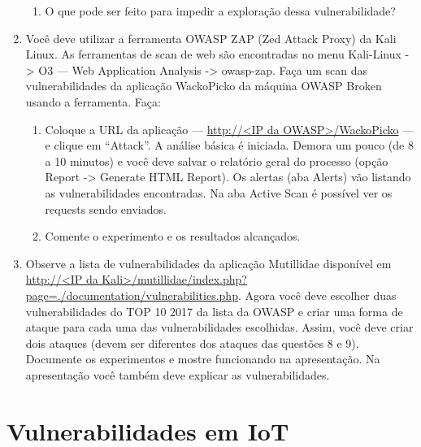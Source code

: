 \documentclass{article}
\begin{document}
\begin{enumerate}
\begin{enumerate}
                \item O que pode ser feito para impedir a exploração dessa
                    vulnerabilidade?
            \end{enumerate}
        \item Você deve utilizar a ferramenta OWASP ZAP (Zed Attack Proxy)
            da Kali Linux. As ferramentas de scan de web são encontradas no
            menu Kali-Linux -> O3 --- Web Application Analysis ->
            owasp-zap. Faça um scan das vulnerabilidades da aplicação
            WackoPicko da máquina OWASP Broken usando a ferramenta. Faça:
            \begin{enumerate}
                \item Coloque a URL da aplicação --- \url{http://<IP da
                    OWASP>/WackoPicko} --- e clique em ``Attack''. A
                    análise básica é iniciada. Demora um pouco (de 8 a 10
                    minutos) e você deve salvar o relatório geral do
                    processo (opção Report -> Generate HTML Report). Os
                    alertas (aba Alerts) vão listando as vulnerabilidades
                    encontradas. Na aba Active Scan é possível ver os
                    requests sendo enviados.
                \item Comente o experimento e os resultados alcançados.
            \end{enumerate}
        \item Observe a lista de vulnerabilidades da aplicação Mutillidae
            disponível em \url{http://<IP da
            Kali>/mutillidae/index.php?page=./documentation/vulnerabilities.php}.
            Agora você deve escolher duas vulnerabilidades do TOP 10 2017
            da lista da OWASP e criar uma forma de ataque para cada uma das
            vulnerabilidades escolhidas. Assim, você deve criar dois
            ataques (devem ser diferentes dos ataques das questões 8 e 9).
            Documente os experimentos e mostre funcionando na apresentação.
            Na apresentação você também deve explicar as vulnerabilidades.
    \end{enumerate}

    \section{Vulnerabilidades em IoT}
\end{document}
